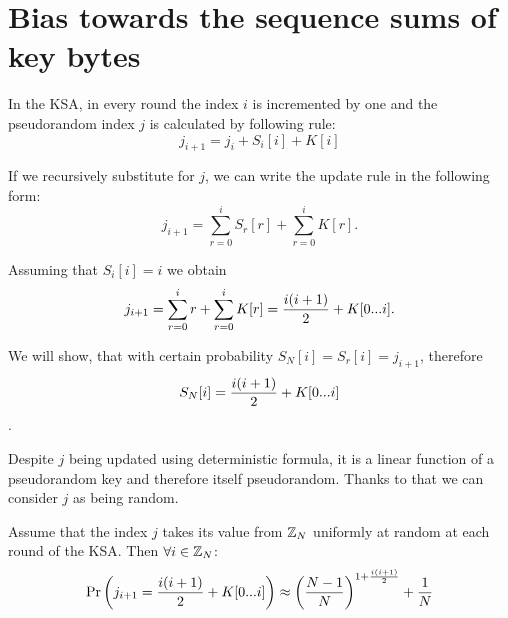 
\section{Bias towards the sequence sums of key bytes}

	In the KSA, in every round the index $ i $ is incremented by one and the pseudorandom index $ j $ is calculated by following rule:
	\[  j_{i+1} = j_{i} + S_{i}[i] + K[i] \]


	 
	If we recursively substitute for $ j $, we can write the update rule in the following form:
	\[ 
	j_{i+1} = \sum_{r=0}^{i}S_{r}[r] + \sum_{r=0}^{i}K[r]
	.\]
	
	Assuming that $ S_{i}[i] = i $ we obtain 
	\[
	 j_{i+1} = \sum_{r=0}^{i}r + \sum_{r=0}^{i}K[r] = \dfrac{i(i+1)}{2} + K[{0}...{i}]
	.\]
	
	 
	 We will show, that with certain probability $ S_{N}[i] = S_{r}[i] = j_{i+1}$, therefore 
 	\[ S_{N}[i] = \dfrac{i(i+1)}{2} + K[{0}...{i}] \].
 	
 	
 	Despite $ j $ being updated using deterministic formula, it is a linear function of a pseudorandom key and therefore itself pseudorandom. Thanks to that we can consider $ j $ as being random.
 	
 	
	 	

	\begin{lemma}
		Assume that the index $ j $ takes its value from $ \mathbb{Z}_{N}  $ uniformly at random at each round of the KSA. Then $ \forall i \in \mathbb{Z}_{N} $:
		\begin{equation}\label{lemma1}
		\Pr \left(j_{i+1} = \dfrac{i(i+1)}{2} + K[{0}...{i}]\right) \approx \left(\dfrac{N-1}{N}\right)^{1+\frac{i(i+1)}{2}} + \dfrac{1}{N} 
		\end{equation}	

	\end{lemma}		


